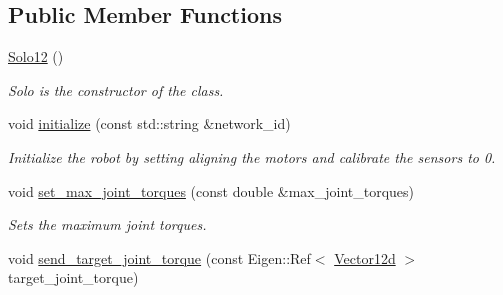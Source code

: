 \subsection*{Public Member Functions}
\begin{DoxyCompactItemize}
\item 
\hyperlink{classblmc__robots_1_1Solo12_a9be95c29e80dca13a2dafa8a0f82eec5}{Solo12} ()
\begin{DoxyCompactList}\small\item\em Solo is the constructor of the class. \end{DoxyCompactList}\item 
void \hyperlink{classblmc__robots_1_1Solo12_a44e7a3d9a2fe163758d63decfdc35b52}{initialize} (const std\+::string \&network\+\_\+id)
\begin{DoxyCompactList}\small\item\em Initialize the robot by setting aligning the motors and calibrate the sensors to 0. \end{DoxyCompactList}\item 
void \hyperlink{classblmc__robots_1_1Solo12_a9f0d4a95fd4f82681f78dda1d519e5f9}{set\+\_\+max\+\_\+joint\+\_\+torques} (const double \&max\+\_\+joint\+\_\+torques)\hypertarget{classblmc__robots_1_1Solo12_a9f0d4a95fd4f82681f78dda1d519e5f9}{}\label{classblmc__robots_1_1Solo12_a9f0d4a95fd4f82681f78dda1d519e5f9}

\begin{DoxyCompactList}\small\item\em Sets the maximum joint torques. \end{DoxyCompactList}\item 
void \hyperlink{classblmc__robots_1_1Solo12_a7f9bbd57bf8f0a9d54542c249c03fb47}{send\+\_\+target\+\_\+joint\+\_\+torque} (const Eigen\+::\+Ref$<$ \hyperlink{common__header_8hpp_a80313eb420184518596e745eecf4b494}{Vector12d} $>$ target\+\_\+joint\+\_\+torque)\hypertarget{classblmc__robots_1_1Solo12_a7f9bbd57bf8f0a9d54542c249c03fb47}{}\label{classblmc__robots_1_1Solo12_a7f9bbd57bf8f0a9d54542c249c03fb47}


\end{DoxyCompactItemize}
